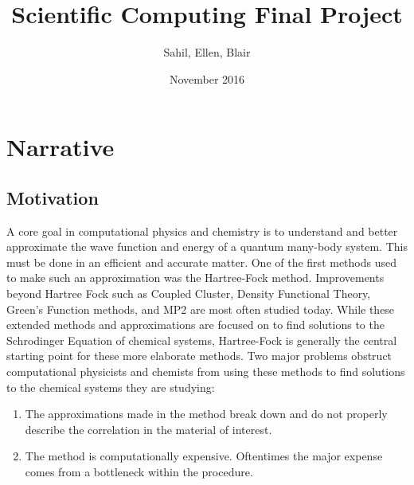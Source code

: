 \documentclass{article}
\title{Scientific Computing Final Project}
\author{Sahil, Ellen, Blair}
\date{November 2016}
\begin{document}
\maketitle

\section{Narrative}


\subsection{Motivation}
A core goal in computational physics and chemistry is to understand and better approximate the wave function and energy of a quantum many-body system.  This must be done in an efficient and accurate matter.  One of the first methods used to make such an approximation was the Hartree-Fock method.  Improvements beyond Hartree Fock such as Coupled Cluster, Density Functional Theory, Green's Function methods, and MP2 are most often studied today.  While these extended methods and approximations are focused on to find solutions to the Schrodinger Equation of chemical systems, Hartree-Fock is generally the central starting point for these more elaborate methods.  \newline
\newline
Two major problems obstruct computational physicists and chemists from using these methods to find solutions to the chemical systems they are studying:

\begin{enumerate} 
    \item The approximations made in the method break down and do not properly describe the correlation in the material of interest.
    \item The method is computationally expensive.  Oftentimes the major expense comes from a bottleneck within the procedure.
\end{enumerate} 
\end{document}
